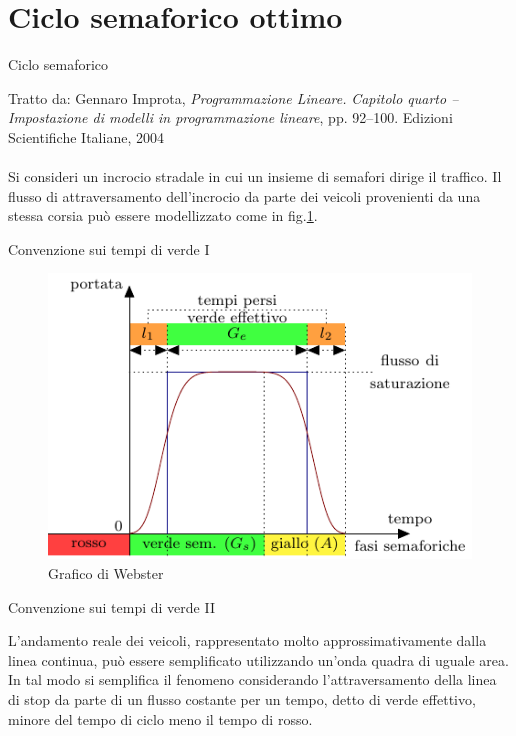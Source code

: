 \documentclass{beamer}
\begin{document}
\generatitolo


\section{Ciclo semaforico ottimo}

\begin{frame}{Ciclo semaforico}

Tratto da: Gennaro Improta, \textit{Programmazione Lineare.} \textsl{Capitolo quarto -- Impostazione di modelli in programmazione lineare}, pp. 92--100. Edizioni Scientifiche Italiane, 2004
\\~\\

Si consideri un incrocio stradale in cui un insieme di semafori dirige il traffico.
Il flusso di attraversamento dell'incrocio da parte dei veicoli provenienti da una stessa corsia pu\`o essere modellizzato come in fig.\ref{fig:webster}.
\end{frame}

\begin{frame}{Convenzione sui tempi di verde I}
\begin{figure}
\includegraphics[height=0.75\textheight]{img/webster}
\caption{Grafico di Webster}\label{fig:webster}
\end{figure}
\end{frame}

\begin{frame}{Convenzione sui tempi di verde II}

L'andamento reale dei veicoli, rappresentato molto approssimativamente dalla linea continua, pu\`o essere semplificato utilizzando un'onda quadra di uguale area. In tal modo si semplifica il fenomeno
considerando l'attraversamento della linea di stop da parte di un flusso costante per un tempo,
detto di verde effettivo, minore del tempo di ciclo meno il tempo di rosso.
\end{frame}
\end{document}
